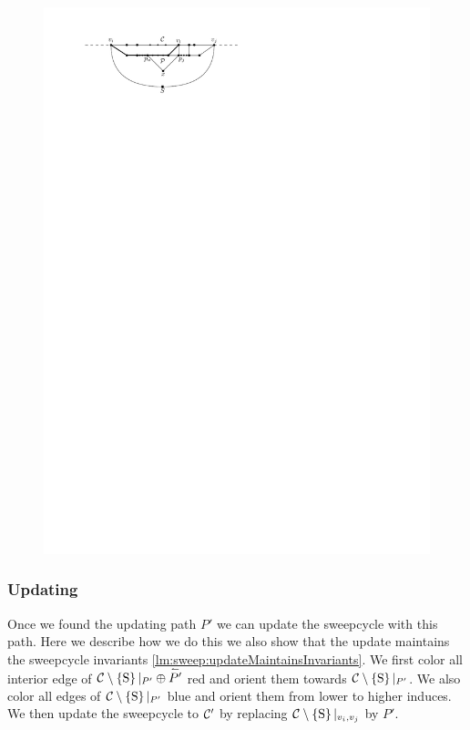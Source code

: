    \begin{figure}[b]
      \centering
      \includegraphics[scale=1]{unifiedAlgo/img/sweep/free2chord}
      \caption{}
      \label{fig:sweep:free2chord}
    \end{figure}

  \subsubsection{Updating}
    \label{sss:sweep:update}
    Once we found the updating path $P'$ we can update the sweepcycle with this path. Here we describe how we do this we also show that the update maintains the sweepcycle invariants \ref{lm:sweep:updateMaintainsInvariants}. We first color all interior edge of $\mathcal{C} \setminus \left\lbrace {\mathrm{S}} \right\rbrace|_{P'} \oplus \accentset{\leftharpoonup}{P'}$ red and orient them towards $\mathcal{C} \setminus \left\lbrace {\mathrm{S}} \right\rbrace|_{P'}$. We also color all edges of $\mathcal{C} \setminus \left\lbrace {\mathrm{S}} \right\rbrace|_{P'}$  blue and orient them from lower to higher induces. We then update the sweepcycle to $\mathcal{C}'$ by replacing $\mathcal{C} \setminus \left\lbrace {\mathrm{S}} \right\rbrace|_{v_i,v_j}$ by $P'$.


